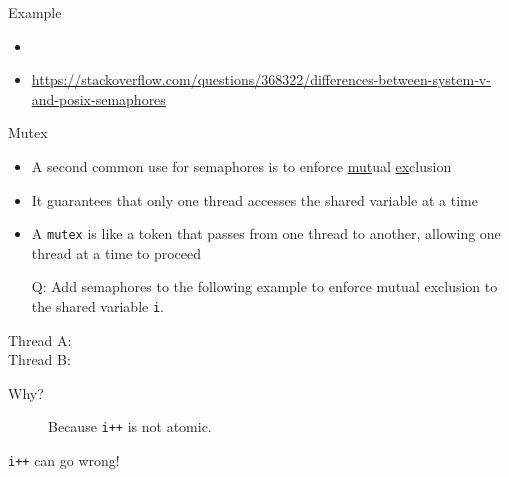 \begin{frame}{Example}%
  \begin{center}
  \end{center}
\end{frame}

\begin{itemize}
\item {}
\item \url{https://stackoverflow.com/questions/368322/differences-between-system-v-and-posix-semaphores}
\end{itemize}

\begin{frame}
  \begin{block}{Mutex}
    \begin{itemize}
    \item A second common use for semaphores is to enforce \underline{mut}ual
      \underline{ex}clusion
    \item It guarantees that only one thread accesses the shared variable at a time
    \item A \texttt{mutex} is like a token that passes from one thread to another, allowing
      one thread at a time to proceed
    \end{itemize}
  \end{block}
  \begin{itemize}
  \item[Q:] Add semaphores to the following example to enforce mutual exclusion to the
    shared variable \texttt{i}.
  \end{itemize}
  \begin{multicols}{2}
    \begin{description}
    \item[Thread A:] 
    \item[Thread B:] 
    \end{description}
  \end{multicols}
  \begin{description}
  \item[Why?] Because \texttt{i++} is not atomic.
  \end{description}
\end{frame}

\begin{frame}{\texttt{i++} {\small can go wrong!}}
\end{frame}

